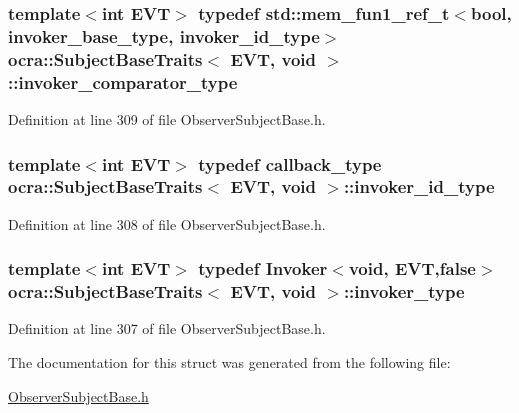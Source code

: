 \subsubsection[{\texorpdfstring{invoker\+\_\+comparator\+\_\+type}{invoker_comparator_type}}]{\setlength{\rightskip}{0pt plus 5cm}template$<$int E\+VT$>$ typedef std\+::mem\+\_\+fun1\+\_\+ref\+\_\+t$<$bool, {\bf invoker\+\_\+base\+\_\+type}, {\bf invoker\+\_\+id\+\_\+type}$>$ {\bf ocra\+::\+Subject\+Base\+Traits}$<$ E\+VT, void $>$\+::{\bf invoker\+\_\+comparator\+\_\+type}}\hypertarget{structocra_1_1SubjectBaseTraits_3_01EVT_00_01void_01_4_a1103b087174cb0f6e007f554c214c4d4}{}\label{structocra_1_1SubjectBaseTraits_3_01EVT_00_01void_01_4_a1103b087174cb0f6e007f554c214c4d4}


Definition at line 309 of file Observer\+Subject\+Base.\+h.

\subsubsection[{\texorpdfstring{invoker\+\_\+id\+\_\+type}{invoker_id_type}}]{\setlength{\rightskip}{0pt plus 5cm}template$<$int E\+VT$>$ typedef {\bf callback\+\_\+type} {\bf ocra\+::\+Subject\+Base\+Traits}$<$ E\+VT, void $>$\+::{\bf invoker\+\_\+id\+\_\+type}}\hypertarget{structocra_1_1SubjectBaseTraits_3_01EVT_00_01void_01_4_a35ce9f06a9f2a9e766ad2fb892283d08}{}\label{structocra_1_1SubjectBaseTraits_3_01EVT_00_01void_01_4_a35ce9f06a9f2a9e766ad2fb892283d08}


Definition at line 308 of file Observer\+Subject\+Base.\+h.

\subsubsection[{\texorpdfstring{invoker\+\_\+type}{invoker_type}}]{\setlength{\rightskip}{0pt plus 5cm}template$<$int E\+VT$>$ typedef {\bf Invoker}$<$void, E\+VT,false$>$ {\bf ocra\+::\+Subject\+Base\+Traits}$<$ E\+VT, void $>$\+::{\bf invoker\+\_\+type}}\hypertarget{structocra_1_1SubjectBaseTraits_3_01EVT_00_01void_01_4_af6c08a6cdc4753f4246a8eebaf73152c}{}\label{structocra_1_1SubjectBaseTraits_3_01EVT_00_01void_01_4_af6c08a6cdc4753f4246a8eebaf73152c}


Definition at line 307 of file Observer\+Subject\+Base.\+h.



The documentation for this struct was generated from the following file\+:\begin{DoxyCompactItemize}
\item 
\hyperlink{ObserverSubjectBase_8h}{Observer\+Subject\+Base.\+h}\end{DoxyCompactItemize}
